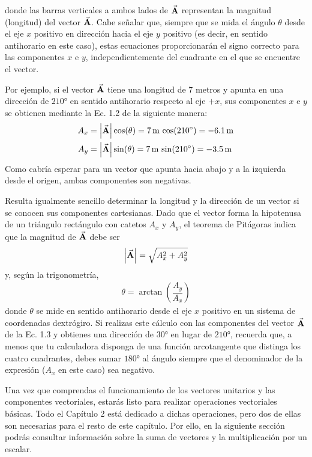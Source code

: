 \documentclass[hidelinks,12pt]{article}
\begin{document}
donde las barras verticales a ambos lados de $\va{A}$ representan la magnitud (longitud) del vector $\va{A}$. Cabe señalar que, siempre que se mida el ángulo $\theta$ desde el eje $x$ positivo en dirección hacia el eje $y$ positivo (es decir, en sentido antihorario en este caso), estas ecuaciones proporcionarán el signo correcto para las componentes $x$ e $y$, independientemente del cuadrante en el que se encuentre el vector.
\par
Por ejemplo, si el vector $\va{A}$ tiene una longitud de 7 metros y apunta en una dirección de $\ang{210}$ en sentido antihorario respecto al eje $+x$, sus componentes $x$ e $y$ se obtienen mediante la Ec. 1.2 de la siguiente manera:
\begin{align}
\begin{aligned}
    A_{x} &= \abs{\va{A}} \cos(\theta) = \SI{7}{\meter} \, \cos(\ang{210}) = \SI{-6.1}{\meter} \\
    A_{y} &= \abs{\va{A}} \sin(\theta) = \SI{7}{\meter} \, \sin(\ang{210}) = \SI{-3.5}{\meter}
\end{aligned}
\label{eq:ecuacion_01_03}
\end{align}
Como cabría esperar para un vector que apunta hacia abajo y a la izquierda desde el origen, ambas componentes son negativas.
\par
Resulta igualmente sencillo determinar la longitud y la dirección de un vector si se conocen sus componentes cartesianas. Dado que el vector forma la hipotenusa de un triángulo rectángulo con catetos $A_{x}$ y $A_{y}$, el teorema de Pitágoras indica que la magnitud de $\va{A}$ debe ser
\begin{align}
    \abs{\va{A}} = \sqrt{A_{x}^{2} + A_{y}^{2}}
\label{eq:ecuacion_01_04}
\end{align}
y, según la trigonometría,
\begin{align}
    \theta = \arctan \left( \dfrac{A_{y}}{A_{x}} \right)
\label{eq:ecuacion_01_05}
\end{align}
donde $\theta$ se mide en sentido antihorario desde el eje $x$ positivo en un sistema de coordenadas dextrógiro. Si realizas este cálculo con las componentes del vector $\va{A}$ de la Ec. 1.3 y obtienes una dirección de $\ang{30}$ en lugar de $\ang{210}$, recuerda que, a menos que tu calculadora disponga de una función arcotangente que distinga los cuatro cuadrantes, debes sumar $\ang{180}$ al ángulo siempre que el denominador de la expresión ($A_{x}$ en este caso) sea negativo.
\par
Una vez que comprendas el funcionamiento de los vectores unitarios y las componentes vectoriales, estarás listo para realizar operaciones vectoriales básicas. Todo el Capítulo 2 está dedicado a dichas operaciones, pero dos de ellas son necesarias para el resto de este capítulo. Por ello, en la siguiente sección podrás consultar información sobre la suma de vectores y la multiplicación por un escalar.
\end{document}

